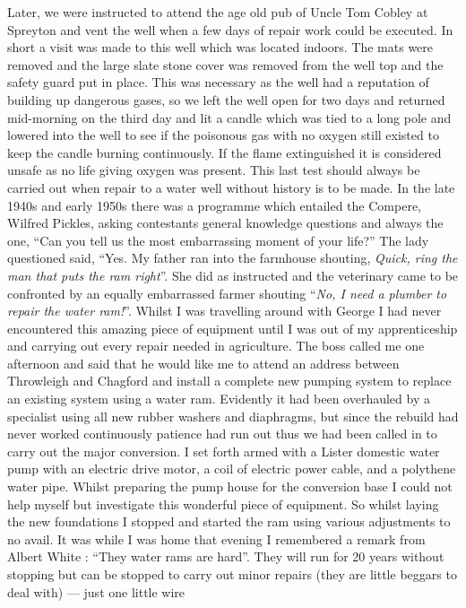 Later, we were instructed to attend the age old pub of Uncle Tom Cobley at
Spreyton and vent the well when a few days of repair work could be executed. In
short a visit was made to this well which was located indoors. The mats were
removed and the large slate stone cover was removed from the well top and the
safety guard put in place. This was necessary as the well had a reputation of
building up dangerous gases, so we left the well open for two days and returned
mid-morning on the third day and lit a candle which was tied to a long pole and
lowered into the well to see if the poisonous gas with no oxygen still existed
to keep the candle burning continuously. If the flame extinguished it is
considered unsafe as no life giving oxygen was present. This last test should
always be carried out when repair to a water well without history is to be
made. In the late 1940s and early 1950s there was a programme which entailed
the Compere, Wilfred Pickles, asking contestants general knowledge questions
and always the one, ``Can you tell us the most embarrassing moment of your
life?'' The lady questioned said, ``Yes. My father ran into the farmhouse
shouting, \emph{Quick, ring the man that puts the ram right}''. She did as
instructed and the veterinary came to be confronted by an equally embarrassed
farmer shouting ``\emph{No, I need a plumber to repair the water ram!}''.
Whilst I was travelling around with George I had never encountered this amazing
piece of equipment until I was out of my apprenticeship and carrying out every
repair needed in agriculture. The boss called me one afternoon and said that he
would like me to attend an address between Throwleigh and Chagford and install
a complete new pumping system to replace an existing system using a water ram.
Evidently it had been overhauled by a specialist using all new rubber washers
and diaphragms, but since the rebuild had never worked continuously patience
had run out thus we had been called in to carry out the major conversion. I set
forth armed with a Lister domestic water pump with an electric drive motor, a
coil of electric power cable, and a polythene water pipe. Whilst preparing the
pump house for the conversion base I could not help myself but investigate this
wonderful piece of equipment. So whilst laying the new foundations I stopped
and started the ram using various adjustments to no avail. It was while I was
home that evening I remembered a remark from Albert White : ``They water rams are
hard''. They will run for 20 years without stopping but can be stopped to carry
out minor repairs (they are little beggars to deal with) --- just one little wire
